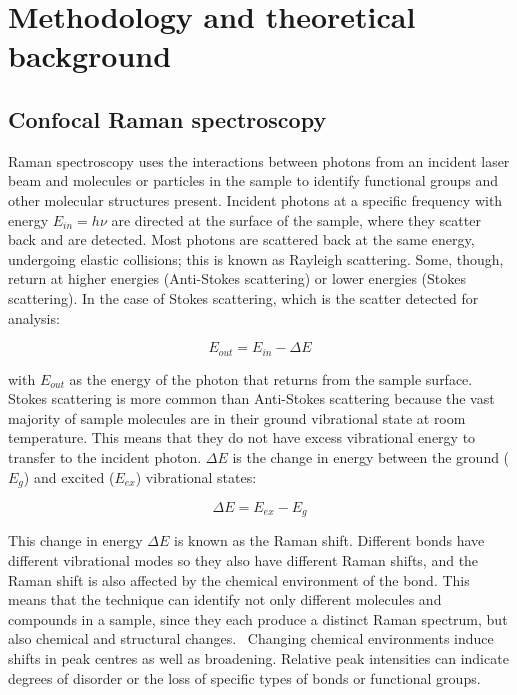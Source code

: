 



\section[Methodology and theoretical background]{Methodology and theoretical background}
\label{section1.2}

\subsection[Confocal Raman spectroscopy]{Confocal Raman spectroscopy}
\label{subsection1.2.1}

Raman spectroscopy uses the interactions between photons from an incident laser beam and molecules or particles in the sample to identify functional groups and other molecular structures present. Incident photons at a specific frequency with energy $E_{in} = h\nu$ are directed at the surface of the sample, where they scatter back and are detected. Most photons are scattered back at the same energy, undergoing elastic collisions; this is known as Rayleigh scattering. Some, though, return at higher energies (Anti-Stokes scattering) or lower energies (Stokes scattering). In the case of Stokes scattering, which is the scatter detected for analysis:

\begin{equation} \label{eq:raman_1}
E_{out} = E_{in} - \Delta E
\end{equation}

with $E_{out}$ as the energy of the photon that returns from the sample surface. Stokes scattering is more common than Anti-Stokes scattering because the vast majority of sample molecules are in their ground vibrational state at room temperature. This means that they do not have excess vibrational energy to transfer to the incident photon. $\Delta E$ is the change in energy between the ground ($E_{g}$) and excited ($E_{ex}$) vibrational states:

\begin{equation} \label{eq:raman_2}
\Delta E = E_{ex} - E_{g}
\end{equation}

This change in energy $\Delta E$ is known as the Raman shift. Different bonds have different vibrational modes so they also have different Raman shifts, and the Raman shift is also affected by the chemical environment of the bond. This means that the technique can identify not only different molecules and compounds in a sample, since they each produce a distinct Raman spectrum, but also chemical and structural changes.~\autocite{2018RS,horiba,matousek_tissue} Changing chemical environments induce shifts in peak centres as well as broadening. Relative peak intensities can indicate degrees of disorder or the loss of specific types of bonds or functional groups.~\autocite{tomasini_raman}

